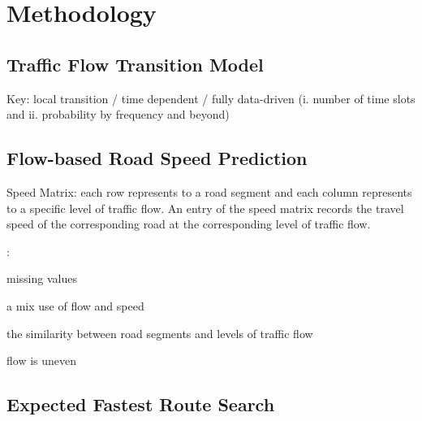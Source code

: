\section{Methodology}
\label{sec-method}


\subsection{Traffic Flow Transition Model}
\label{subsec-transition}

Key: local transition / time dependent / fully data-driven (i. number of time slots and ii. probability by frequency and beyond)



\subsection{Flow-based Road Speed Prediction}
\label{subsec-speed}

Speed Matrix: each row represents to a road segment and each column represents to a specific level of traffic flow. An entry of the speed matrix records the travel speed of the corresponding road at the corresponding level of traffic flow.


:
\bi
\item missing values
\item a mix use of flow and speed
\item the similarity between road segments and levels of traffic flow
\item flow is uneven
\ei

\subsection{Expected Fastest Route Search}
\label{subsec-route}